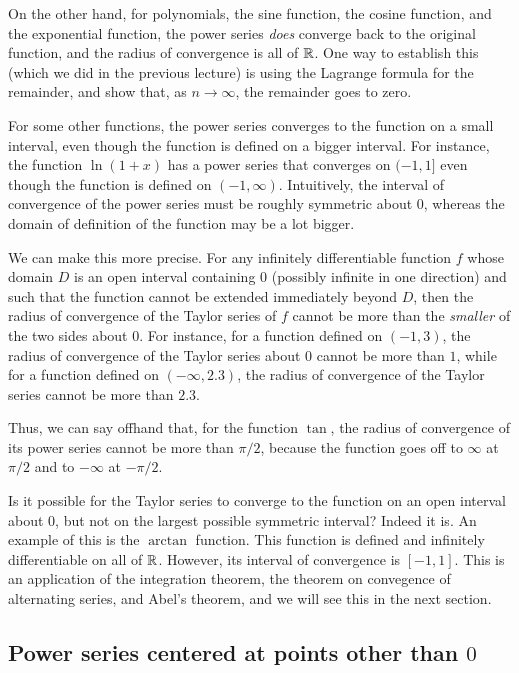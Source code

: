 \documentclass{amsart}
\begin{document}
On the other hand, for polynomials, the sine function, the cosine
function, and the exponential function, the power series {\em does}
converge back to the original function, and the radius of convergence
is all of $\mathbb{R}$. One way to establish this (which we did in the
previous lecture) is using the Lagrange formula for the remainder, and
show that, as $n \to \infty$, the remainder goes to zero.

For some other functions, the power series converges to the function
on a small interval, even though the function is defined on a bigger
interval. For instance, the function $\ln(1 + x)$ has a power series
that converges on $(-1,1]$ even though the function is defined on
$(-1,\infty)$. Intuitively, the interval of convergence of the power
series must be roughly symmetric about $0$, whereas the domain of
definition of the function may be a lot bigger.

We can make this more precise. For any infinitely differentiable
function $f$ whose domain $D$ is an open interval containing $0$
(possibly infinite in one direction) and such that the function cannot
be extended immediately beyond $D$, then the radius of convergence of
the Taylor series of $f$ cannot be more than the {\em smaller} of the
two sides about $0$. For instance, for a function defined on $(-1,3)$,
the radius of convergence of the Taylor series about $0$ cannot be
more than $1$, while for a function defined on $(-\infty,2.3)$, the
radius of convergence of the Taylor series cannot be more than $2.3$.

Thus, we can say offhand that, for the function $\tan$, the radius of
convergence of its power series cannot be more than $\pi/2$, because
the function goes off to $\infty$ at $\pi/2$ and to $-\infty$ at
$-\pi/2$.

Is it possible for the Taylor series to converge to the function on an
open interval about $0$, but not on the largest possible symmetric
interval? Indeed it is. An example of this is the $\arctan$
function. This function is defined and infinitely differentiable on
all of $\mathbb{R}$. However, its interval of convergence is $[-1,1]$. This is
an application of the integration theorem, the theorem on convegence
of alternating series, and Abel's theorem, and we will see this in the
next section.

\subsection{Power series centered at points other than $0$}
\end{document}
